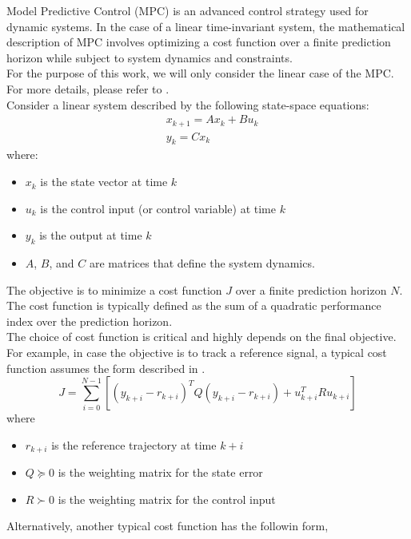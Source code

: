 Model Predictive Control (MPC) is an advanced control strategy used for dynamic systems. In the case of a linear time-invariant system, the mathematical description of MPC involves optimizing a cost function over a finite prediction horizon while subject to system dynamics and constraints. \\
For the purpose of this work, we will only consider the linear case of the MPC. For more details, please refer to \cite{rawlings2020model}. \\
Consider a linear system described by the following state-space equations:
\begin{align}
	&x_{k+1} = Ax_k + Bu_k \nonumber \\
	 &y_k = Cx_k \label{eq:linear_system}
\end{align}
where:
\begin{itemize}
	\item $x_k$ is the state vector at time $k$
	\item $u_k$ is the control input (or control variable) at time $k$
	\item $y_k$ is the output at time $k$
	\item $A$, $B$, and $C$ are matrices that define the system dynamics.
\end{itemize}
The objective is to minimize a cost function $J$ over a finite prediction horizon $N$. The cost function is typically defined as the sum of a quadratic performance index over the prediction horizon. \\
The choice of cost function is critical and highly depends on the final objective. For example, in case the objective is to track a reference signal, a typical cost function assumes the form described in . 
\begin{equation}
	J = \sum_{i=0}^{N-1} \left[ (y_{k+i} - r_{k+i})^T Q (y_{k+i} - r_{k+i}) + u_{k+i}^T R u_{k+i} \right] 
	\label{eq:cost_f_1}
\end{equation} 
where
\begin{itemize}
	\item $r_{k+i}$ is the reference trajectory at time $k+i$
	\item  $Q \succeq 0$ is the weighting matrix for the state error
	\item $R \succ 0$ is the weighting matrix for the control input
\end{itemize}
Alternatively, another typical cost function has the followin form, 

